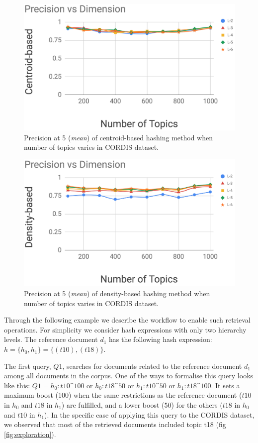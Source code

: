 \begin{figure}[t]\centering
\includegraphics[scale=0.25]{chhm-pd.png}
\caption{Precision at 5 (\textit{mean}) of centroid-based hashing method when number of topics varies in CORDIS dataset.}
\label{fig:chhm_pd}
\end{figure}


\begin{figure}[t]\centering
\includegraphics[scale=0.25]{dhhm-pd.png}
\caption{Precision at 5 (\textit{mean}) of density-based hashing method when number of topics varies in CORDIS dataset.}
\label{fig:dhhm_pd}
\end{figure}

Through the following example we describe the workflow to enable such retrieval operations. For simplicity we consider hash expressions with only two hierarchy levels. The reference document $d_1$ has the following hash expression: $h=\{h_0,h_1\}=\{(t10),(t18)\}$.

The first query, $Q1$, searches for documents related to the reference document $d_1$ among all documents in the corpus. One of the ways to formalise this query looks like this: $Q1=h_0:t10$\^{}$100$ or $h_0:t18$\^{}$50$ or $h_1:t10$\^{}$50$ or $h_1:t18$\^{}$100$.  It sets a maximum boost (100) when the same restrictions as the reference document ($t10$ in $h_0$ and $t18$ in $h_1$) are fulfilled, and a lower boost (50) for the others ($t18$ in $h_0$ and $t10$ in $h_1$). In the specific case of applying this query to the CORDIS dataset, we observed that most of the retrieved documents included topic t18 (fig \ref{fig:exploration}).


